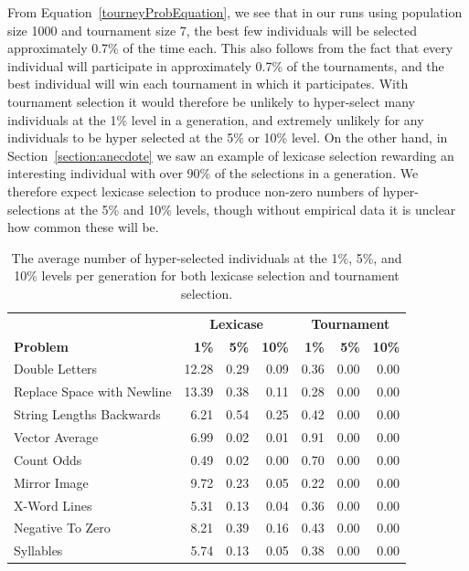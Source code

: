 \documentclass{sig-alternate-05-2015}
\begin{document}
From Equation~\ref{tourneyProbEquation}, we see that in our runs using population size 1000 and tournament size 7, the best few individuals will be selected approximately 0.7\% of the time each. This also follows from the fact that every individual will participate in approximately 0.7\% of the tournaments, and the best individual will win each tournament in which it participates.
With tournament selection it would therefore be unlikely to hyper-select many individuals at the 1\% level in a generation, and extremely unlikely for any individuals to be hyper selected at the 5\% or 10\% level.
On the other hand, in Section~\ref{section:anecdote} we saw an example of lexicase selection rewarding an interesting individual with over 90\% of the selections in a generation. We therefore expect lexicase selection to produce non-zero numbers of hyper-selections at the 5\% and 10\% levels, though without empirical data it is unclear how common these will be.

\begin{table}[t]
\centering
\caption{The average number of hyper-selected individuals at the 1\%, 5\%, and 10\% levels per generation for both lexicase selection and tournament selection.}
\label{table:hyper-selections}
\begin{tabular}{l | rrr | rrr}
\toprule
  & \multicolumn{3}{c|}{\textbf{Lexicase}} & \multicolumn{3}{c}{\textbf{Tournament}} \\
\textbf{Problem} & \textbf{1\%}  & \textbf{5\%}  & \textbf{10\%}  & \textbf{1\%}      & \textbf{5\%}      & \textbf{10\%}     \\
\midrule
Double Letters             & 12.28 & 0.29 & 0.09 & 0.36 & 0.00 & 0.00 \\
Replace Space with Newline & 13.39 & 0.38 & 0.11 & 0.28 & 0.00 & 0.00 \\
String Lengths Backwards   & 6.21  & 0.54 & 0.25 & 0.42 & 0.00 & 0.00 \\
Vector Average             & 6.99  & 0.02 & 0.01 & 0.91 & 0.00 & 0.00 \\
Count Odds                 & 0.49  & 0.02 & 0.00 & 0.70 & 0.00 & 0.00 \\
Mirror Image               & 9.72  & 0.23 & 0.05 & 0.22 & 0.00 & 0.00 \\
X-Word Lines               & 5.31  & 0.13 & 0.04 & 0.36 & 0.00 & 0.00 \\
Negative To Zero           & 8.21  & 0.39 & 0.16 & 0.43 & 0.00 & 0.00 \\
Syllables                  & 5.74  & 0.13 & 0.05 & 0.38 & 0.00 & 0.00 \\
\bottomrule
\end{tabular}
\end{table}
\end{document}
